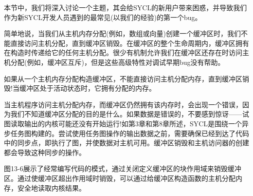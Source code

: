 本节中，我们将深入讨论一个主题，其会给SYCL的新用户带来困惑，并导致我们作为新SYCL开发人员遇到的最常见(以我们的经验)的第一个bug。\par

简单地说，当我们从主机内存分配(例如，数组或向量)创建一个缓冲区时，我们不能直接访问主机分配，直到缓冲区销毁。在缓冲区的整个生命周期内，缓冲区拥有在构造时传递给它的任何主机分配。很少有机制允许我们在缓冲区还存在时访问主机分配(例如，缓冲区互斥)，但是这些高级特性对调试早期bug没有帮助。\par

\begin{tcolorbox}[colback=red!5!white,colframe=red!75!black]
如果从一个主机内存分配构造缓冲区，不能直接访问主机分配内存，直到缓冲区销毁!当缓冲区处于活动状态时，它拥有分配的内存。
\end{tcolorbox}

当主机程序访问主机分配内存，而缓冲区仍然拥有该内存时，会出现一个错误，因为我们不知道缓冲区分配的目的是什么。如果数据是错误的，不要感到惊讶——试图读取输出的内核可能还没有开始运行!如第3章和第8章所述，SYCL是围绕一个异步任务图构建的。尝试使用任务图操作的输出数据之前，需要确保已经到达了代码中的同步点，即执行了图，并使数据对主机可用。缓冲区销毁和主机访问器的创建都会导致这种同步的操作。\par

图13-6展示了经常编写代码的模式，通过关闭定义缓冲区的块作用域来销毁缓冲区。通过使缓冲区超出作用域时销毁，可以通过给缓冲区构造函数的主机分配内存，安全地读取内核结果。\par


